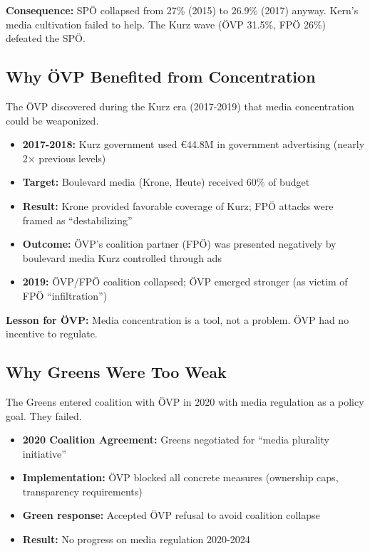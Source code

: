 {\textbf{Consequence:} SPÖ collapsed from 27\% (2015) to 26.9\% (2017) anyway. Kern's media cultivation
failed to help. The Kurz wave (ÖVP 31.5\%, FPÖ 26\%) defeated the SPÖ.

\subsection*{Why ÖVP Benefited from Concentration}

The ÖVP discovered during the Kurz era (2017-2019) that media concentration could be weaponized.

\begin{itemize}
\item \textbf{2017-2018:} Kurz government used €44.8M in government advertising (nearly 2× previous levels)
\item \textbf{Target:} Boulevard media (Krone, Heute) received 60\% of budget
\item \textbf{Result:} Krone provided favorable coverage of Kurz; FPÖ attacks were framed as ``destabilizing''
\item \textbf{Outcome:} ÖVP's coalition partner (FPÖ) was presented negatively by boulevard media Kurz controlled through ads
\item \textbf{2019:} ÖVP/FPÖ coalition collapsed; ÖVP emerged stronger (as victim of FPÖ ``infiltration'')
\end{itemize}

\textbf{Lesson for ÖVP:} Media concentration is a tool, not a problem. ÖVP had no incentive to regulate.

\subsection*{Why Greens Were Too Weak}

The Greens entered coalition with ÖVP in 2020 with media regulation as a policy goal. They failed.

\begin{itemize}
\item \textbf{2020 Coalition Agreement:} Greens negotiated for ``media plurality initiative''
\item \textbf{Implementation:} ÖVP blocked all concrete measures (ownership caps, transparency requirements)
\item \textbf{Green response:} Accepted ÖVP refusal to avoid coalition collapse
\item \textbf{Result:} No progress on media regulation 2020-2024
\end{itemize}

}
